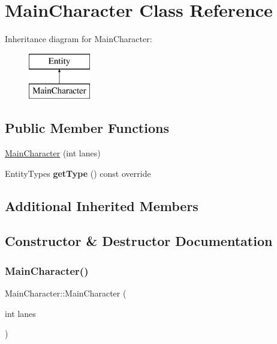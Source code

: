 \hypertarget{class_main_character}{}\section{Main\+Character Class Reference}
\label{class_main_character}
Inheritance diagram for Main\+Character\+:\begin{figure}[H]
\begin{center}
\leavevmode
\includegraphics[height=2.000000cm]{class_main_character}
\end{center}
\end{figure}
\subsection*{Public Member Functions}
\begin{DoxyCompactItemize}
\item 
\hyperlink{class_main_character_aacd15121a3f8cab760aec751e348e17d}{Main\+Character} (int lanes)
\item 
\mbox{\label{class_main_character_ac3acc3f570b8f8024ec760ab4e738cde}} 
Entity\+Types {\bfseries get\+Type} () const override
\end{DoxyCompactItemize}
\subsection*{Additional Inherited Members}


\subsection{Constructor \& Destructor Documentation}
\mbox{\label{class_main_character_aacd15121a3f8cab760aec751e348e17d}} 
\subsubsection{\texorpdfstring{Main\+Character()}{MainCharacter()}}
{\footnotesize\ttfamily Main\+Character\+::\+Main\+Character (\begin{DoxyParamCaption}\item[{int}]{lanes }\end{DoxyParamCaption})}

